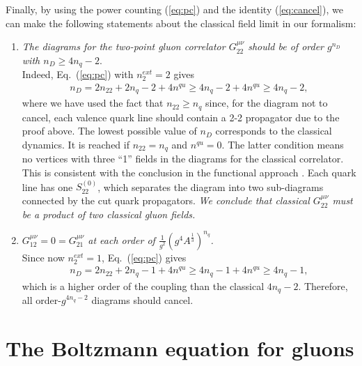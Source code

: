 \documentclass[onecolumn,showpacs,nobibnotes,nofootinbib,12pt,aps,prd,showpacs,notitlepage,nofootinbib,preprintnumbers,amsmath,amssymb]{article}
\def\eq#1{{Eq.~(\ref{#1})}}
\begin{document}
Finally, by using the power counting (\ref{eq:pc}) and the identity
(\ref{eq:cancel}), we can make the following statements about the
classical field limit in our formalism:
\begin{enumerate}
\item{\it The diagrams for the two-point gluon correlator
    $G_{22}^{\mu\nu}$ should be of order $g^{n_D}$ with $n_D \ge 4 n_q
    -2$}. \\
  Indeed, \eq{eq:pc} with $n_2^{ext}=2$ gives
  \begin{align}
    \label{eq:pc2}
    n_D = 2 n_{22} + 2 n_q -2 + 4 n^{qu} \ge 4 n_q -2 + 4 n^{qu} \ge 4 n_q -2,
  \end{align}
  where we have used the fact that $n_{22} \ge n_q$ since, for the
  diagram not to cancel, each valence quark line should contain a 2-2
  propagator due to the proof above. The lowest possible value of
  $n_D$ corresponds to the classical dynamics. It is reached if
  $n_{22} = n_q$ and $n^{qu} =0$. The latter condition means no
  vertices with three ``1'' fields in the diagrams for the classical
  correlator. This is consistent with the conclusion in the functional
  approach \cite{Mueller:2002gd}. Each quark line has one
  $S^{(0)}_{22}$, which separates the diagram into two sub-diagrams
  connected by the cut quark propagators. {\it We conclude that
    classical $G_{22}^{\mu\nu}$ must be a product of two classical
    gluon fields.}

\item{\it $G_{12}^{\mu\nu}=0= G_{21}^{\mu\nu}$ at each order of
    $\frac{1}{g^2} (g^4 A^{\frac{1}{3}})^{n_q}$.} \\  Since
  now $n_2^{ext}=1$, \eq{eq:pc} gives
  \begin{align}
    \label{eq:pc3}
    n_D = 2 n_{22} + 2 n_q -1 + 4 n^{qu} \ge 4 n_q -1 + 4 n^{qu} \ge 4 n_q -1,
  \end{align}
  which is a higher order of the coupling than the classical $4 n_q
  -2$. Therefore, all order-$g^{4 n_q -2}$ diagrams should cancel.
\end{enumerate}





\section{The Boltzmann equation for gluons}
\label{B}
\end{document}
